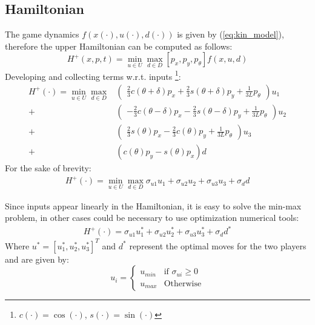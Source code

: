 \subsection{Hamiltonian}
The game dynamics $f(x(\cdot), u(\cdot), d(\cdot))$ is given by (\ref{eq:kin_model}), therefore the upper Hamiltonian can be computed as follows:
\begin{equation*}
  H^+(x,p,t) = \min_{u \in U}\max_{d \in D} [p_x, p_y, p_{\theta}] f(x, u, d)
\end{equation*}
Developing and collecting terms w.r.t. inputs \footnote{$c(\cdot)=\cos(\cdot)$, $s(\cdot)=\sin(\cdot)$}:
\begin{equation*}
  \begin{split}
    H^{+}(\cdot) = \min_{u \in U}\max_{d \in D} 
    &
      \begin{pmatrix}
        \frac{2}{3}c{(\theta + \delta)}p_x +  \frac{2}{3}s{(\theta + \delta)}p_y + \frac{1}{3L}p_{\theta}
      \end{pmatrix}u_{1} 
    \\ +  
    &
      \begin{pmatrix}
        -\frac{2}{3}c{(\theta -\delta)}p_x -\frac{2}{3}s{(\theta -\delta)}p_y + \frac{1}{3L}p_{\theta} 
      \end{pmatrix}u_{2} 
    \\ +  
    &
      \begin{pmatrix}
        \frac{2}{3}s{(\theta)}p_x -\frac{2}{3}c{(\theta)}p_y + \frac{1}{3L}p_{\theta} 
      \end{pmatrix}u_{3} 
    \\ + 
    &
      (c{(\theta)}p_y-s{(\theta)}p_x)d
  \end{split}
\end{equation*}
For the sake of brevity:
\begin{equation*}
  \begin{split}
    H^{+}(\cdot) = \min_{u \in U}\max_{d \in D} \sigma_{u1} u_{1} +\sigma_{u2} u_{2} + \sigma_{u3} u_{3} + \sigma_{d} d
  \end{split}
\end{equation*}

Since inputs appear linearly in the Hamiltonian, it is easy to solve the min-max problem, in other cases could be necessary to use optimization numerical tools:
\begin{equation}
  \begin{split}
    H^{+}(\cdot) = \sigma_{u1} u_{1}^* +\sigma_{u2} u_{2}^* + \sigma_{u3} u_{3}^* + \sigma_{d} d^*
  \end{split}
  \label{opt_ham}
\end{equation}
Where $u^* = [u_1^*, u_2^*, u_3^*]^T$ and $d^*$ represent the optimal moves for the two players and are given by:
\begin{equation}
  u_i = 
	\begin{cases} 
		u_{min} &\text{if } \sigma_{ui} \geq 0\\
		u_{max} &\text{Otherwise} 
	\end{cases}
\end{equation}

